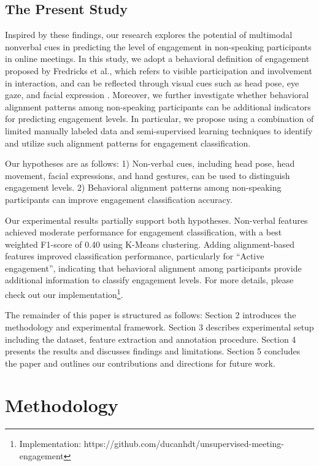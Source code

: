 \documentclass[
]{ceurart}
\begin{document}
\subsection{The Present Study}
Inspired by these findings, our research explores the potential of multimodal nonverbal cues in predicting the level of engagement in non-speaking participants in online meetings. In this study, we adopt a behavioral definition of engagement proposed by Fredricks et al.\cite{fredricks2004school}, which refers to visible participation and involvement in interaction, and can be reflected through visual cues such as head pose, eye gaze, and facial expression \cite{kaur2018prediction}. Moreover, we further investigate whether behavioral alignment patterns among non-speaking participants can be additional indicators for predicting engagement levels. In particular, we propose using a combination of limited manually labeled data and semi-supervised learning techniques to identify and utilize such alignment patterns for engagement classification. 

Our hypotheses are as follows: 1) Non-verbal cues, including head pose, head movement, facial expressions, and hand gestures, can be used to distinguish engagement levels. 2) Behavioral alignment patterns among non-speaking participants can improve engagement classification accuracy.

Our experimental results partially support both hypotheses. Non-verbal features achieved moderate performance for engagement classification, with a best weighted F1-score of 0.40 using K-Means clustering. Adding alignment-based features improved classification performance, particularly for “Active engagement”, indicating that behavioral alignment among participants provide additional information to classify engagement levels. For more details, please check out our implementation\footnote{Implementation: https://github.com/ducanhdt/unsupervised-meeting-engagement}.

The remainder of this paper is structured as follows: Section 2 introduces the methodology and experimental framework. Section 3 describes experimental setup including the dataset, feature extraction and annotation procedure. Section 4 presents the results and discusses findings and limitations. Section 5 concludes the paper and outlines our contributions and directions for future work.

\section{Methodology}
\end{document}
